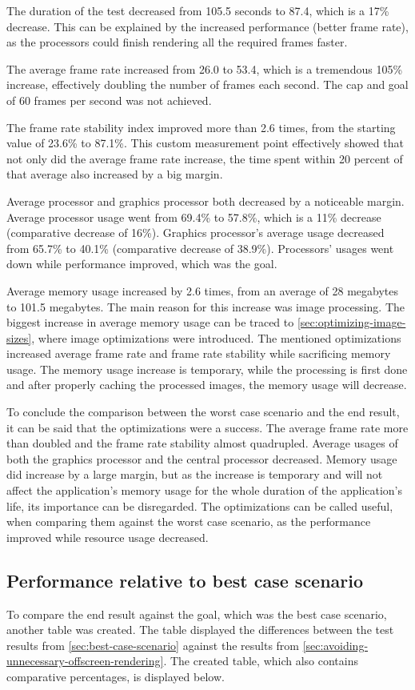 \documentclass[a4paper,12pt]{article}
\begin{document}
The duration of the test decreased from 105.5 seconds to 87.4, which is a 17\% decrease. This can be explained by the increased performance (better frame rate), as the processors could finish rendering all the required frames faster.

The average frame rate increased from 26.0 to 53.4, which is a tremendous 105\% increase, effectively doubling the number of frames each second. The cap and goal of 60 frames per second was not achieved.

The frame rate stability index improved more than 2.6 times, from the starting value of 23.6\% to 87.1\%. This custom measurement point effectively showed that not only did the average frame rate increase, the time spent within 20 percent of that average also increased by a big margin.

Average processor and graphics processor both decreased by a noticeable margin. Average processor usage went from 69.4\% to 57.8\%, which is a 11\% decrease (comparative decrease of 16\%). Graphics processor's average usage decreased from 65.7\% to 40.1\% (comparative decrease of 38.9\%). Processors' usages went down while performance improved, which was the goal.

Average memory usage increased by 2.6 times, from an average of 28 megabytes to 101.5 megabytes. The main reason for this increase was image processing. The biggest increase in average memory usage can be traced to \autoref{sec:optimizing-image-sizes}, where image optimizations were introduced. The mentioned optimizations increased average frame rate and frame rate stability while sacrificing memory usage. The memory usage increase is temporary, while the processing is first done and after properly caching the processed images, the memory usage will decrease.

To conclude the comparison between the worst case scenario and the end result, it can be said that the optimizations were a success. The average frame rate more than doubled and the frame rate stability almost quadrupled. Average usages of both the graphics processor and the central processor decreased. Memory usage did increase by a large margin, but as the increase is temporary and will not affect the application's memory usage for the whole duration of the application's life, its importance can be disregarded. The optimizations can be called useful, when comparing them against the worst case scenario, as the performance improved while resource usage decreased.

\subsection{Performance relative to best case scenario}
To compare the end result against the goal, which was the best case scenario, another table was created. The table displayed the differences between the test results from \autoref{sec:best-case-scenario} against the results from \autoref{sec:avoiding-unnecessary-offscreen-rendering}. The created table, which also contains comparative percentages, is displayed below.
\end{document}
